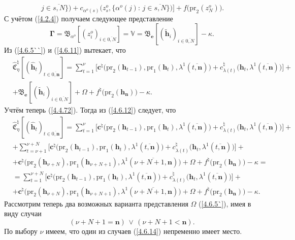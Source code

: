 \documentclass[12pt,twoside]{report}
\newcommand{\bfn}{\begin{equation}}
\newcommand{\efn}{\end{equation}}
\newcommand{\ov}{\overline}
\newcommand{\Om}{\Omega}
\newcommand{\la}{\lambda}
\newcommand{\al}{\alpha}
\newcommand{\zc}{{\mathbf c}}
\newcommand{\nn}{{\mathbf n}}
\begin{document}
{{$$\,j\in\ov{s,N}\}\bigl)+ c_{\al^o(s)}\bigl(z_s^o,\{\al^o(j):\,j\in\ov{s,N}\}\bigl)\bigl]
+f\bigl(\mathrm{pr}_2(z_N^o)\bigl).
$$
С учётом (\ref{4.2.4}) получаем следующее представление
\bfn\label{4.6.11}
\mathbf{\Gamma}= \mathfrak{B}_{\al^o}[(z_i^o)_{i\in\ov{0,N}}] =\mathbb{V}=
\mathfrak{B}_\mathbf{e}[(\tilde{\mathbf{h}}_i)_{i\in\ov{0,N}}] - \kappa.
\efn
Из (\ref{4.6.5``}) и (\ref{4.6.11}) вытекает, что
\begin{eqnarray}
&\widehat{\mathfrak{C}}_\eta^\natural[(\hat{\mathbf{h}}_t)_{t\in\ov{0,\nn}}]=
\sum\limits_{t=1}^\nu\bigl[\zc^\natural\bigl(\mathrm{pr}_2(\mathbf{h}_{t-1}),
\mathrm{pr}_1(\mathbf{h}_t),
\la^1(\ov{t,\nn})\bigl) + c_{\la(t)}^\natural\bigl(\mathbf{h}_t,\la^1(\ov{t,\nn})\bigl)\bigl] +
&\nonumber\\
&+ \mathfrak{B}_\mathbf{e}
[(\tilde{\mathbf{h}}_i)_{i\in\ov{0,N}}] + \Om +
f^\natural\bigl(\mathrm{pr}_2(\mathbf{h}_\nn)\bigl) -\kappa.
&\label{4.6.12}
\end{eqnarray}
Учтём теперь (\ref{4.4.72}). Тогда из (\ref{4.6.12}) следует, что
\begin{eqnarray}
&\widehat{\mathfrak{C}}_\eta^\natural[(\hat{\mathbf{h}}_t)_{t\in\ov{0,\nn}}]=
\sum\limits_{t=1}^\nu\bigl[\zc^\natural\bigl(\mathrm{pr}_2(\mathbf{h}_{t-1}),\mathrm{pr}_1(\mathbf{h}_t),
 \la^1(\ov{t,\nn})\bigl) + c_{\la(t)}^\natural\bigl(\mathbf{h}_t,\la^1(\ov{t,\nn})\bigl)\bigl] +
&\nonumber\\
&+\sum\limits_{t=\nu+1}^{\nu+N}\bigl[\zc^\natural\bigl(\mathrm{pr}_2(\mathbf{h}_{t-1}),\mathrm{pr}_1
(\mathbf{h}_t),\la^1(\ov{t,\nn})\bigl)+ c_{\la(t)}^\natural\bigl(\mathbf{h}_t,\la^1(\ov{t,\nn})\bigl)\bigl] +
&\nonumber\\
&+ \zc^\natural\bigl(\mathrm{pr}_2(\mathbf{h}_{\nu+N}),\mathrm{pr}_1(\mathbf{h}_{\nu+N+1}),
\la^1(\ov{\nu+N+1,\nn})\bigl)+ \Om + f^\natural\bigl(\mathrm{pr}_2(\mathbf{h}_\nn)\bigl) -\kappa =
&\nonumber\\
&= \sum\limits_{t=1}^{\nu+N}\bigl[\zc^\natural\bigl(\mathrm{pr}_2(\mathbf{h}_{t-1}),\mathrm{pr}_1
(\mathbf{h}_t),\la^1(\ov{t,\nn})\bigl)+ c_{\la(t)}^\natural\bigl(\mathbf{h}_t,\la^1(\ov{t,\nn})\bigl)\bigl] +
&\nonumber\\
&+ \zc^\natural\bigl(\mathrm{pr}_2(\mathbf{h}_{\nu+N}),\mathrm{pr}_1(\mathbf{h}_{\nu+N+1}),
\la^1(\ov{\nu+N+1,\nn})\bigl)+ \Om + f^\natural\bigl(\mathrm{pr}_2(\mathbf{h}_\nn)\bigl) -\kappa.
&\label{4.6.13}
\end{eqnarray}
 Рассмотрим теперь два возможных варианта представления $\Om$ (\ref{4.6.5`}), имея в виду случаи
 \bfn\label{4.6.14}(\nu+N+1 = \nn)\,\vee\,(\nu+N+ 1< \nn).
 \efn
 По выбору $\nu$ имеем, что один из случаев (\ref{4.6.14}) непременно имеет место.

}}
\end{document}
